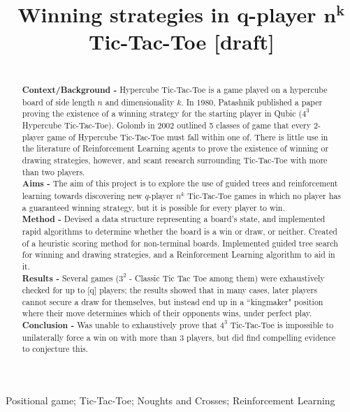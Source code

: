 \documentclass[12pt,a4paper]{article}
\title{Winning strategies in $\mathbf{q}$-player $\mathbf{n^k}$ Tic-Tac-Toe [draft]}
\author{} %
\date{}
\begin{document}
\maketitle

\begin{abstract}\\
\textbf{Context/Background - } Hypercube Tic-Tac-Toe is a game played on a hypercube board of side length $n$ and dimensionality $k$. In 1980, Patashnik published a paper proving the existence of a winning strategy for the starting player in Qubic ($4^3$ Hypercube Tic-Tac-Toe).
Golomb in 2002 outlined 5 classes of game that every 2-player game of Hypercube Tic-Tac-Toe must fall within one of. There is little use in the literature of Reinforcement Learning agents to prove the existence of winning or drawing strategies, however, and scant research surrounding Tic-Tac-Toe with more than two players. 
\\\textbf{Aims - } The aim of this project is to explore the use of guided trees and reinforcement learning towards discovering new $q$-player $n^k$ Tic-Tac-Toe games in which no player has a guaranteed winning strategy, but it is possible for every player to win. 
\\\textbf{Method - } Devised a data structure representing a board's state, and implemented rapid algorithms to determine whether the board is a win or draw, or neither. Created of a heuristic scoring method for non-terminal boards. Implemented guided tree search for winning and drawing strategies, and a Reinforcement Learning algorithm to aid in it. 
\\\textbf{Results - } Several games ($3^2$ - Classic Tic Tac Toe among them) were exhaustively checked for up to [q] players; the results showed that in many cases, later players cannot secure a draw for themselves, but instead end up in a ``kingmaker" position where their move determines which of their opponents wins, under perfect play.
\\
\textbf{Conclusion - } Was unable to exhaustively prove that $4^3$ Tic-Tac-Toe is impossible to unilaterally force a win on with more than 3 players, but did find compelling evidence to conjecture this.

\end{abstract}

\begin{keywords}
Positional game; Tic-Tac-Toe; Noughts and Crosses; Reinforcement Learning
\end{keywords}
\end{document}
